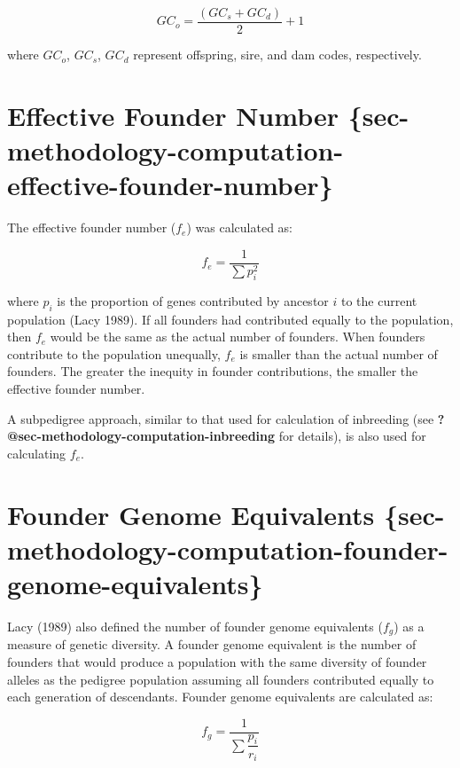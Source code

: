 \documentclass[
  letterpaper,
  DIV=11,
  numbers=noendperiod]{scrreprt}
\begin{document}
\[ GC_o = \dfrac{(GC_s+GC_d)}{2}+1 \]

where \(GC_o\), \(GC_s\), \(GC_d\) represent offspring, sire, and dam
codes, respectively.

\section{Effective Founder Number
\{sec-methodology-computation-effective-founder-number\}}\label{effective-founder-number-sec-methodology-computation-effective-founder-number}

The effective founder number (\(f_e\)) was calculated as:

\[ f_e = \dfrac{1}{\sum{p_i^2}} \]

where \(p_i\) is the proportion of genes contributed by ancestor \(i\)
to the current population (Lacy 1989). If all founders had contributed
equally to the population, then \(f_e\) would be the same as the actual
number of founders. When founders contribute to the population
unequally, \(f_e\) is smaller than the actual number of founders. The
greater the inequity in founder contributions, the smaller the effective
founder number.

A subpedigree approach, similar to that used for calculation of
inbreeding (see \textbf{?@sec-methodology-computation-inbreeding} for
details), is also used for calculating \(f_e\).

\section{Founder Genome Equivalents
\{sec-methodology-computation-founder-genome-equivalents\}}\label{founder-genome-equivalents-sec-methodology-computation-founder-genome-equivalents}

Lacy (1989) also defined the number of founder genome equivalents
(\(f_g\)) as a measure of genetic diversity. A founder genome equivalent
is the number of founders that would produce a population with the same
diversity of founder alleles as the pedigree population assuming all
founders contributed equally to each generation of descendants. Founder
genome equivalents are calculated as:

\[ f_g = \dfrac{ 1 } { \sum{ \dfrac{p_i} {r_i} } } \]
\end{document}
